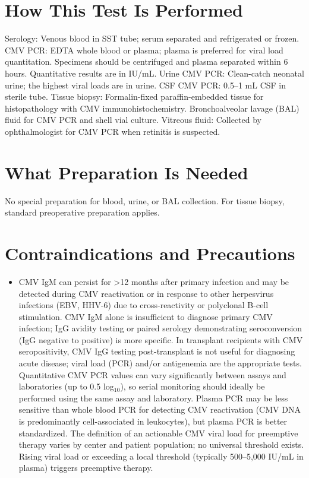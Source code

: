 \section*{How This Test Is Performed}
Serology: Venous blood in SST tube; serum separated and refrigerated or frozen. CMV PCR: EDTA whole blood or plasma; plasma is preferred for viral load quantitation. Specimens should be centrifuged and plasma separated within 6 hours. Quantitative results are in IU/mL. Urine CMV PCR: Clean-catch neonatal urine; the highest viral loads are in urine. CSF CMV PCR: 0.5--1 mL CSF in sterile tube. Tissue biopsy: Formalin-fixed paraffin-embedded tissue for histopathology with CMV immunohistochemistry. Bronchoalveolar lavage (BAL) fluid for CMV PCR and shell vial culture. Vitreous fluid: Collected by ophthalmologist for CMV PCR when retinitis is suspected.

\section*{What Preparation Is Needed}
No special preparation for blood, urine, or BAL collection. For tissue biopsy, standard preoperative preparation applies.

\section*{Contraindications and Precautions}
\begin{itemize}
  \item CMV IgM can persist for >12 months after primary infection and may be detected during CMV reactivation or in response to other herpesvirus infections (EBV, HHV-6) due to cross-reactivity or polyclonal B-cell stimulation. CMV IgM alone is insufficient to diagnose primary CMV infection; IgG avidity testing or paired serology demonstrating seroconversion (IgG negative to positive) is more specific. In transplant recipients with CMV seropositivity, CMV IgG testing post-transplant is not useful for diagnosing acute disease; viral load (PCR) and/or antigenemia are the appropriate tests. Quantitative CMV PCR values can vary significantly between assays and laboratories (up to 0.5 log$_{10}$), so serial monitoring should ideally be performed using the same assay and laboratory. Plasma PCR may be less sensitive than whole blood PCR for detecting CMV reactivation (CMV DNA is predominantly cell-associated in leukocytes), but plasma PCR is better standardized. The definition of an actionable CMV viral load for preemptive therapy varies by center and patient population; no universal threshold exists. Rising viral load or exceeding a local threshold (typically 500--5,000 IU/mL in plasma) triggers preemptive therapy.
\end{itemize}
